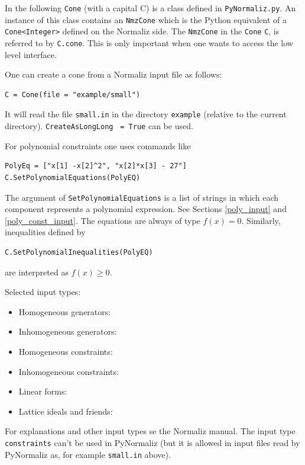 \begin{small}
In the following \verb|Cone| (with a capital C) is a class defined in \verb|PyNormaliz.py|. An instance of this class contains an \verb|NmzCone| which is the Python equivalent of a \verb|Cone<Integer>| defined on the Normaliz side. The \verb|NmzCone| in the \verb|Cone| \verb|C|, is referred to by \verb|C.cone|. This is only important when one wants to access the low level interface.

One can create a cone from a Normaliz input file as follows:
\begin{Verbatim}
C = Cone(file = "example/small")
\end{Verbatim}
It will read the file \verb|small.in| in the directory \verb|example| (relative to the current directory).  \verb|CreateAsLongLong| \verb| = True| can be used.

For polynomial constraints one uses commands like
\begin{Verbatim}
PolyEq = ["x[1] -x[2]^2", "x[2]*x[3] - 27"]
C.SetPolynomialEquations(PolyEQ)
\end{Verbatim}
The argument of \verb|SetPolynomialEquations| is a list of strings in which each component represents a polynomial expression. See Sections \ref{poly_input} and \ref{poly_const_input}. The equations are always of type $f(x) = 0$. Similarly, inequalities defined by
\begin{Verbatim}
C.SetPolynomialInequalities(PolyEQ)
\end{Verbatim}
are interpreted as $f(x) \ge 0$.

Selected input types:
\begin{itemize}
\item Homogeneous generators:
\item Inhomogeneous generators:
\item Homogeneous constraints:
\item  Inhomogeneous constraints:
\item Linear forms:
\item Lattice ideals and friends:
\end{itemize}
For explanations and other input types se the Normaliz manual. The input type \verb|constraints| can't be used in PyNormaliz (but it is allowed in input files read by PyNormaliz as, for example \verb*|small.in| above).


\end{small}
